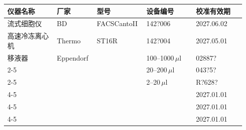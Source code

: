 \documentclass[UTF8,10pt,a4paper,fontset=fandol]{ctexart}
\newcommand{\fieldvalue}[1]{#1}
\newcommand{\handwritten}[1]{#1}
\begin{document}
\begin{tabular}{|p{0.20\linewidth}|p{0.16\linewidth}|p{0.20\linewidth}|p{0.20\linewidth}|p{0.20\linewidth}|}
\hline
仪器名称 & 厂家 & 型号 & 设备编号 & 校准有效期 \\
\hline
流式细胞仪 &
\fieldvalue{BD} &
\fieldvalue{FACSCantoII} &
\fieldvalue{\handwritten{142?006}} &
\fieldvalue{\handwritten{2027.06.02}}
\\
\hline
高速冷冻离心机 &
\fieldvalue{Thermo} &
\fieldvalue{ST16R} &
\fieldvalue{\handwritten{142?004}} &
\fieldvalue{\handwritten{2027.05.01}}
\\
\hline
移液器 &
\fieldvalue{Eppendorf} &
 &
\fieldvalue{\handwritten{100--1000\,$\mu$l}} &
\fieldvalue{\handwritten{02887?}}
\\
\cline{2-5}
 &
 &
 &
\fieldvalue{\handwritten{20--200\,$\mu$l}} &
\fieldvalue{\handwritten{043?5?}}
\\
\cline{2-5}
 &
 &
 &
\fieldvalue{\handwritten{2--20\,$\mu$l}} &
\fieldvalue{\handwritten{R?628?}}
\\
\cline{4-5}
 &
 &
 &
 &
\fieldvalue{\handwritten{2027.01.01}}
\\
\cline{4-5}
 &
 &
 &
 &
\fieldvalue{\handwritten{2027.01.01}}
\\
\cline{4-5}
 &
 &
 &
 &
\fieldvalue{\handwritten{2027.01.01}}
\\
\hline
\end{tabular}
\end{document}
